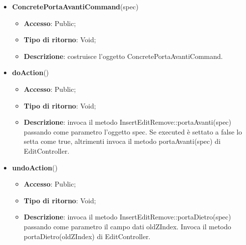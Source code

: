 {{{		
		\begin{itemize}
			\item \textbf{ConcretePortaAvantiCommand}(spec)
			\begin{itemize}
				\item \textbf{Accesso}: Public;
				\item \textbf{Tipo di ritorno}: Void;
				\item \textbf{Descrizione}: costruisce l’oggetto ConcretePortaAvantiCommand.
			\end{itemize}
			\item \textbf{doAction}()
			\begin{itemize}
				\item \textbf{Accesso}: Public;
				\item \textbf{Tipo di ritorno}: Void;
				\item \textbf{Descrizione}: invoca il metodo InsertEditRemove::portaAvanti(spec) passando come parametro l'oggetto spec. Se executed è settato a false lo setta come true, altrimenti invoca il metodo portaAvanti(spec) di EditController.
			\end{itemize}
			\item \textbf{undoAction}()
			\begin{itemize}
				\item \textbf{Accesso}: Public;
				\item \textbf{Tipo di ritorno}: Void;
				\item \textbf{Descrizione}: invoca il metodo InsertEditRemove::portaDietro(spec) passando come parametro il campo dati oldZIndex. Invoca il metodo portaDietro(oldZIndex) di EditController.
			\end{itemize}
		\end{itemize}
}

}}

